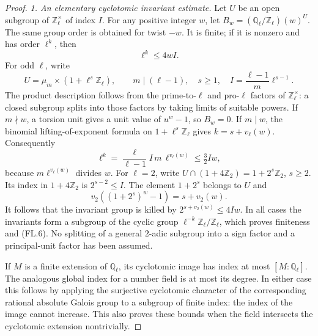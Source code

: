\begin{proof}
\emph{1. An elementary cyclotomic invariant estimate.}
Let \(U\) be an open subgroup of
\(\mathbb Z_\ell^\times\) of index \(I\).
For any positive integer \(w\), let
\(B_w=(\mathbb Q_\ell/\mathbb Z_\ell)(w)^U\).
The same group order is obtained for twist \(-w\).
It is finite; if it is nonzero and has order \(\ell^k\),
then
\[
                           \ell^k\leq4wI .
 \tag{FL.6}
\]
For odd \(\ell\), write
\[
 U=\mu_m\times(1+\ell^s\mathbb Z_\ell),\qquad
 m\mid(\ell-1),\quad s\geq1,\quad
 I=\frac{\ell-1}{m}\ell^{s-1}.
 \tag{FL.7}
\]
The product description follows from the prime-to-\(\ell\)
and pro-\(\ell\) factors of \(\mathbb Z_\ell^\times\):
a closed subgroup splits into those factors by taking
limits of suitable powers.
If \(m\nmid w\), a torsion unit gives a unit value of
\(u^w-1\), so \(B_w=0\).
If \(m\mid w\), the binomial lifting-of-exponent formula
on \(1+\ell^s\mathbb Z_\ell\) gives
\(k=s+v_\ell(w)\).
Consequently
\[
 \ell^k
    =\frac{\ell}{\ell-1}I\,m\,\ell^{v_\ell(w)}
    \leq\tfrac32 Iw ,
 \]
because \(m\ell^{v_\ell(w)}\) divides \(w\).
For \(\ell=2\), write
\(U\cap(1+4\mathbb Z_2)=1+2^s\mathbb Z_2\), \(s\geq2\).
Its index in \(1+4\mathbb Z_2\) is \(2^{s-2}\leq I\).
The element \(1+2^s\) belongs to \(U\) and
\[
              v_2((1+2^s)^w-1)=s+v_2(w).
 \]
It follows that the invariant group is killed by
\(2^{s+v_2(w)}\leq4Iw\).
In all cases the invariants form a subgroup of the cyclic
group \(\ell^{-k}\mathbb Z_\ell/\mathbb Z_\ell\), which
proves finiteness and (FL.6).
No splitting of a general \(2\)-adic subgroup into a sign
factor and a principal-unit factor has been assumed.

If \(M\) is a finite extension of \(\mathbb Q_\ell\), its
cyclotomic image has index at most \([M:\mathbb Q_\ell]\).
The analogous global index for a number field is at most
its degree.  In either case this follows by applying the
surjective cyclotomic character of the corresponding
rational absolute Galois group to a subgroup of finite
index: the index of the image cannot increase.
This also proves these bounds when the field intersects
the cyclotomic extension nontrivially.


\end{proof}
